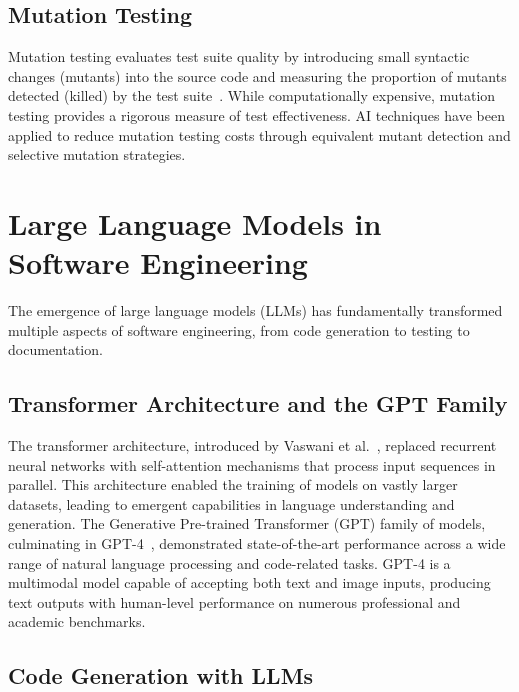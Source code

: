 \subsection{Mutation Testing}
\label{subsec:mutation_testing}

Mutation testing evaluates test suite quality by introducing small
syntactic changes (mutants) into the source code and measuring the
proportion of mutants detected (killed) by the test
suite~\cite{aniche2022testing}. While computationally expensive, mutation
testing provides a rigorous measure of test effectiveness. AI techniques
have been applied to reduce mutation testing costs through equivalent
mutant detection and selective mutation strategies.

\section{Large Language Models in Software Engineering}
\label{sec:llm_se}

The emergence of large language models (LLMs) has fundamentally
transformed multiple aspects of software engineering, from code
generation to testing to documentation.

\subsection{Transformer Architecture and the GPT Family}
\label{subsec:transformers}

The transformer architecture, introduced by Vaswani et
al.~\cite{vaswani2017attention}, replaced recurrent neural networks
with self-attention mechanisms that process input sequences in parallel.
This architecture enabled the training of models on vastly larger
datasets, leading to emergent capabilities in language understanding
and generation. The Generative Pre-trained Transformer (GPT) family
of models, culminating in GPT-4~\cite{openai2023gpt4}, demonstrated
state-of-the-art performance across a wide range of natural language
processing and code-related tasks. GPT-4 is a multimodal model capable
of accepting both text and image inputs, producing text outputs with
human-level performance on numerous professional and academic
benchmarks.

\subsection{Code Generation with LLMs}
\label{subsec:code_gen}

